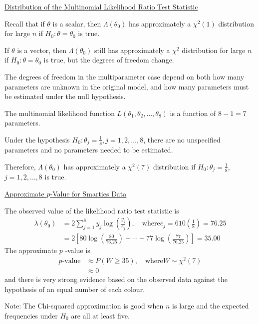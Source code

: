 \documentclass[oneside]{book}
\begin{document}
\underline{Distribution of the Multinomial Likelihood Ratio Test Statistic}

Recall that if $\theta$ is a scalar, then $\Lambda\left(\theta_{0}\right)$ has approximately
a $\chi^{2}(1)$ distribution for large $n$ if $H_{0}: \theta=\theta_{0}$ is true.

If $\theta$ is a vector, then $\Lambda\left(\theta_{0}\right)$ still has approximately a $\chi^{2}$
distribution for large $n$ if $H_{0}: \theta=\theta_{0}$ is true, but the degrees of freedom change.

The degrees of freedom in the multiparameter case depend on both how many parameters are unknown in
the original model, and how many parameters must be estimated under the null hypothesis.


The multinomial likelihood function $L\left(\theta_{1}, \theta_{2}, \ldots, \theta_{8}\right)$ is
a function of $8-1=7$ parameters.

Under the hypothesis $H_{0}: \theta_{j}=\frac{1}{8}, j=1,2, \ldots, 8$, there are no
unspecified parameters and no parameters needed to be estimated.

Therefore, $\Lambda\left(\theta_{0}\right)$ has approximately a $\chi^{2}(7)$ distribution if
$H_{0}: \theta_{j}=\frac{1}{8} $, $ j=1,2, \ldots, 8$ is true.

\underline{Approximate $ p $-Value for Smarties Data}

The observed value of the likelihood ratio test statistic is
\[
    \begin{aligned}
        \lambda\left(\theta_{0}\right) & =2 \sum_{j=1}^{8} y_{j} \log \left(\frac{y_{j}}{e_{j}}\right), \quad \text{where} e_{j}=610\left(\frac{1}{8}\right)=76.25 \\
                                       & =2\left[80 \log \left(\frac{80}{76.25}\right)+\cdots+77 \log \left(\frac{77}{76.25}\right)\right]=35.00
    \end{aligned}
\]
The approximate $p$ -value is
\[
    \begin{aligned}
        p\text{-value}
         & \approx P(W \geq 35), \quad \text{where} W \sim \chi^{2}(7) \\
         & \approx 0
    \end{aligned}
\]
and there is very strong evidence based on the observed data against the hypothesis of
an equal number of each colour.

Note: The Chi-squared approximation is good when $n$ is large and the expected
frequencies under $H_{0}$ are all at least five.
\end{document}
